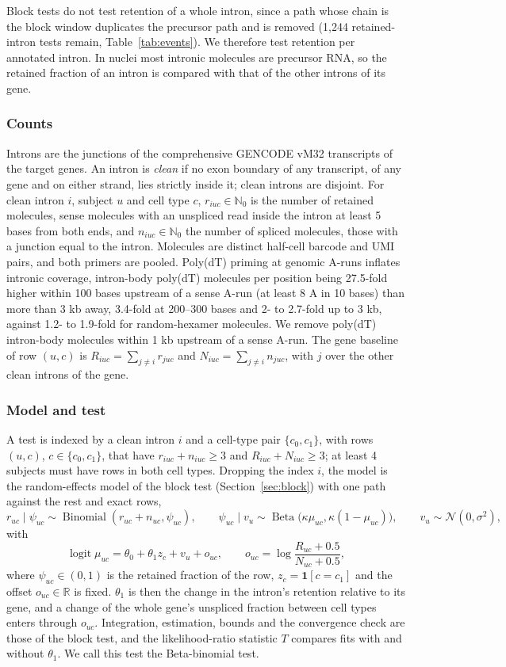 \documentclass[11pt]{article}
\newcommand{\logit}{\operatorname{logit}}
\newcommand{\BetaDist}{\operatorname{Beta}}
\begin{document}
Block tests do not test retention of a whole intron, since a path whose chain is the block window duplicates the precursor path and is removed (1{,}244 retained-intron tests remain, Table~\ref{tab:events}). We therefore test retention per annotated intron. In nuclei most intronic molecules are precursor RNA, so the retained fraction of an intron is compared with that of the other introns of its gene.

\subsubsection{Counts}

Introns are the junctions of the comprehensive GENCODE vM32 transcripts of the target genes. An intron is \emph{clean} if no exon boundary of any transcript, of any gene and on either strand, lies strictly inside it; clean introns are disjoint. For clean intron $i$, subject $u$ and cell type $c$, $r_{iuc}\in\mathbb N_0$ is the number of retained molecules, sense molecules with an unspliced read inside the intron at least 5 bases from both ends, and $n_{iuc}\in\mathbb N_0$ the number of spliced molecules, those with a junction equal to the intron. Molecules are distinct half-cell barcode and UMI pairs, and both primers are pooled. Poly(dT) priming at genomic A-runs inflates intronic coverage, intron-body poly(dT) molecules per position being 27.5-fold higher within 100 bases upstream of a sense A-run (at least 8 A in 10 bases) than more than 3 kb away, 3.4-fold at 200--300 bases and 2- to 2.7-fold up to 3 kb, against 1.2- to 1.9-fold for random-hexamer molecules. We remove poly(dT) intron-body molecules within 1 kb upstream of a sense A-run. The gene baseline of row $(u,c)$ is $R_{iuc}=\sum_{j\neq i}r_{juc}$ and $N_{iuc}=\sum_{j\neq i}n_{juc}$, with $j$ over the other clean introns of the gene.

\subsubsection{Model and test}

A test is indexed by a clean intron $i$ and a cell-type pair $\{c_0,c_1\}$, with rows $(u,c)$, $c\in\{c_0,c_1\}$, that have $r_{iuc}+n_{iuc}\ge3$ and $R_{iuc}+N_{iuc}\ge3$; at least 4 subjects must have rows in both cell types. Dropping the index $i$, the model is the random-effects model of the block test (Section~\ref{sec:block}) with one path against the rest and exact rows, \[r_{uc}\mid\psi_{uc}\sim\operatorname{Binomial}(r_{uc}+n_{uc},\psi_{uc}),\qquad \psi_{uc}\mid v_u\sim\BetaDist\big(\kappa\mu_{uc},\kappa(1-\mu_{uc})\big),\qquad v_u\sim\mathcal N(0,\sigma^2),\] with \[\logit\mu_{uc}=\theta_0+\theta_1z_c+v_u+o_{uc},\qquad o_{uc}=\log\frac{R_{uc}+0.5}{N_{uc}+0.5},\] where $\psi_{uc}\in(0,1)$ is the retained fraction of the row, $z_c=\mathbf 1[c=c_1]$ and the offset $o_{uc}\in\mathbb R$ is fixed. $\theta_1$ is then the change in the intron's retention relative to its gene, and a change of the whole gene's unspliced fraction between cell types enters through $o_{uc}$. Integration, estimation, bounds and the convergence check are those of the block test, and the likelihood-ratio statistic $T$ compares fits with and without $\theta_1$. We call this test the Beta-binomial test.
\end{document}
